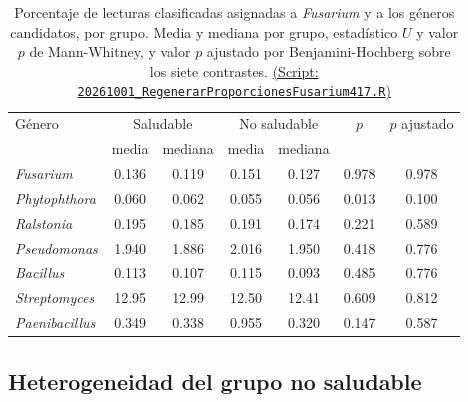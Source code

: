 \begin{table}[H]
\centering
\caption{Porcentaje de lecturas clasificadas asignadas a \textit{Fusarium} y a los géneros candidatos,
por grupo. Media y mediana por grupo, estadístico $U$ y valor $p$ de Mann-Whitney, y valor $p$
ajustado por Benjamini-Hochberg sobre los siete contrastes. \href{https://github.com/CamilaSilva1995/Tesis_Maestria/blob/main/Analisis_Comparativo/Fresa_Solena/20261001_RegenerarProporcionesFusarium417.R}{(Script: \texttt{20261001\_RegenerarProporcionesFusarium417.R})}}
\label{tab:taxones-candidatos}
\small
\begin{tabular}{lcccccc}
\hline
Género & \multicolumn{2}{c}{Saludable} & \multicolumn{2}{c}{No saludable} & $p$ & $p$ ajustado \\
       & media & mediana & media & mediana & & \\
\hline
\textit{Fusarium}      & 0.136 & 0.119 & 0.151 & 0.127 & 0.978 & 0.978 \\
\textit{Phytophthora}  & 0.060 & 0.062 & 0.055 & 0.056 & 0.013 & 0.100 \\
\textit{Ralstonia}     & 0.195 & 0.185 & 0.191 & 0.174 & 0.221 & 0.589 \\
\textit{Pseudomonas}   & 1.940 & 1.886 & 2.016 & 1.950 & 0.418 & 0.776 \\
\textit{Bacillus}      & 0.113 & 0.107 & 0.115 & 0.093 & 0.485 & 0.776 \\
\textit{Streptomyces}  & 12.95 & 12.99 & 12.50 & 12.41 & 0.609 & 0.812 \\
\textit{Paenibacillus} & 0.349 & 0.338 & 0.955 & 0.320 & 0.147 & 0.587 \\
\hline
\end{tabular}
\end{table}

\subsection{Heterogeneidad del grupo no saludable}

